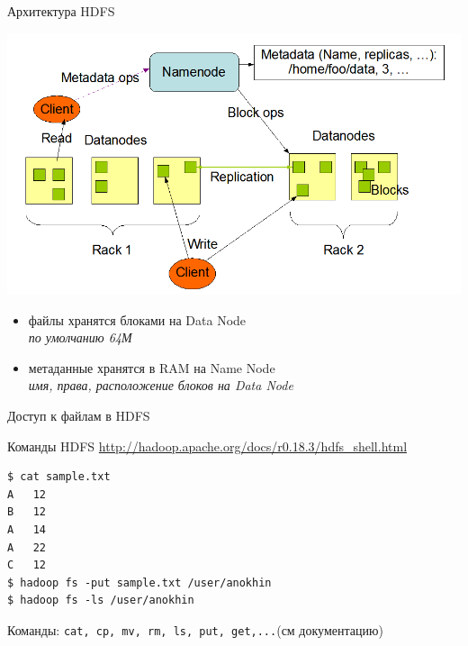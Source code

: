 \documentclass[10pt,a4paper]{beamer}
\begin{document}
\begin{frame}{Архитектура HDFS}

\vspace{-2em}
\begin{center}
\includegraphics[scale=0.3]{images/hdfs.png}
\end{center}
\vspace{-2em}
\begin{itemize}
\item файлы хранятся блоками на Data Node \\ {\it по умолчанию 64М} 
\item метаданные хранятся в RAM на Name Node \\ {\it имя, права, расположение блоков на Data Node}
\end{itemize}

\end{frame}


\begin{frame}[fragile]{Доступ к файлам в HDFS}

Команды HDFS \url{http://hadoop.apache.org/docs/r0.18.3/hdfs_shell.html}

\begin{small}
\begin{shaded}
{\color{green} \begin{verbatim}
$ cat sample.txt 
A	12
B	12
A	14
A	22
C	12
$ hadoop fs -put sample.txt /user/anokhin
$ hadoop fs -ls /user/anokhin
\end{verbatim}}
\end{shaded}
\end{small}

Команды: \texttt{cat, cp, mv, rm, ls, put, get,...}(см документацию)

\end{frame}
\end{document}
